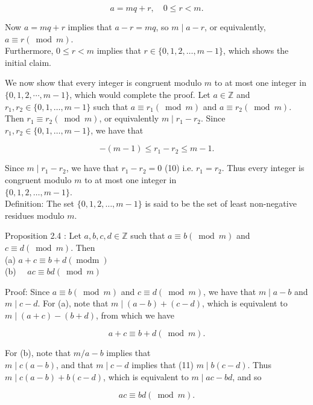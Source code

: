 \documentclass[10pt]{article}
\begin{document}
$$
a=m q+r, \quad 0 \leq r<m .
$$

Now $a=m q+r$ implies that $a-r=m q$, so $m \mid a-r$, or equivalently, $a \equiv r(\bmod m)$.\\
Furthermore, $0 \leq r<m$ implies that $r \in\{0,1,2, \ldots, m-1\}$, which shows the initial claim.

We now show that every integer is congruent modulo $m$ to at most one integer in $\{0,1,2, \cdots, m-1\}$, which would complete the proof. Let $a \in \mathbb{Z}$ and $r_{1}, r_{2} \in\{0,1, \ldots, m-1\}$ such that $a \equiv r_{1}(\bmod m)$ and $a \equiv r_{2}(\bmod m)$.\\
Then $r_{1} \equiv r_{2}(\bmod m)$, or equivalently $m \mid r_{1}-r_{2}$. Since $r_{1}, r_{2} \in\{0,1, \ldots, m-1\}$, we have that

$$
-(m-1) \leq r_{1}-r_{2} \leq m-1 .
$$

Since $m \mid r_{1}-r_{2}$, we have that $r_{1}-r_{2}=0$ (10) i.e. $r_{1}=r_{2}$. Thus every integer is congruent modulo $m$ to at most one integer in\\
$\{0,1,2, \ldots, m-1\}$.\\
Definition: The set $\{0,1,2, \ldots, m-1\}$ is said to be the set of least non-negative residues modulo $m$.

Proposition 2.4 : Let $a, b, c, d \in \mathbb{Z}$ such that $a \equiv b(\bmod m)$ and $c \equiv d(\bmod m)$. Then\\
(a) $a+c \equiv b+d(\operatorname{modm})$\\
(b) $\quad a c \equiv b d(\bmod m)$

Proof: Since $a \equiv b(\bmod m)$ and $c \equiv d(\bmod m)$, we have that $m \mid a-b$ and $m \mid c-d$. For (a), note that $m \mid(a-b)+(c-d)$, which is equivalent to $m \mid(a+c)-(b+d)$, from which we have

$$
a+c \equiv b+d(\bmod m) .
$$

For (b), note that $m / a-b$ implies that\\
$m \mid c(a-b)$, and that $m \mid c-d$ implies that (11) $m \mid b(c-d)$. Thus $m \mid c(a-b)+b(c-d)$, which is equivalent to $m \mid a c-b d$, and so

$$
a c \equiv b d(\bmod m) .
$$
\end{document}
